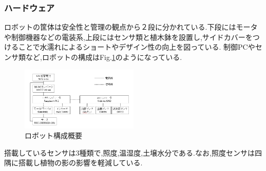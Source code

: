 \documentclass[10pt]{jsarticle}
\begin{document}
\subsubsection{ハードウェア}
ロボットの筐体は安全性と管理の観点から２段に分かれている.下段にはモータや制御機器などの電装系,上段にはセンサ類と植木鉢を設置し,サイドカバーをつけることで水濡れによるショートやデザイン性の向上を図っている.
制御PCやセンサ類など,ロボットの構成はFig.\ref{robot_hard}のようになっている.
\begin{figure}[t]
    \centering
    \includegraphics[width=0.5\textwidth]{img/hard.png}
    \caption{ロボット構成概要}
    \label{robot_hard}
\end{figure}
搭載しているセンサは3種類で,照度,温湿度,土壌水分である.なお,照度センサは四隅に搭載し植物の影の影響を軽減している.
\end{document}
